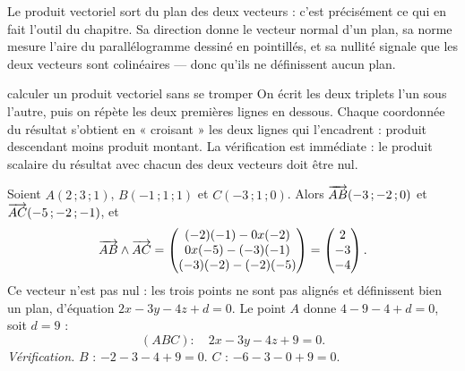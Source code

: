 \begin{visualisation}
\begin{center}
\end{center}

Le produit vectoriel sort du plan des deux vecteurs : c'est précisément ce qui
en fait l'outil du chapitre. Sa direction donne le vecteur normal d'un plan,
sa norme mesure l'aire du parallélogramme dessiné en pointillés, et sa
nullité signale que les deux vecteurs sont colinéaires — donc qu'ils ne
définissent aucun plan.
\end{visualisation}

\begin{methode}{calculer un produit vectoriel sans se tromper}
On écrit les deux triplets l'un sous l'autre, puis on répète les deux
premières lignes en dessous. Chaque coordonnée du résultat s'obtient en
« croisant » les deux lignes qui l'encadrent : produit descendant moins
produit montant. La vérification est immédiate : le produit scalaire du
résultat avec chacun des deux vecteurs doit être nul.
\end{methode}

\begin{exemple}
Soient $A(2\,;3\,;1)$, $B(-1\,;1\,;1)$ et $C(-3\,;1\,;0)$. Alors
$\overrightarrow{AB}(-3\,;-2\,;0)$ et $\overrightarrow{AC}(-5\,;-2\,;-1)$, et
\[
  \overrightarrow{AB} \wedge \overrightarrow{AC} =
  \begin{pmatrix}
    (-2)(-1)-0 x(-2) \\ 0 x(-5)-(-3)(-1) \\
    (-3)(-2)-(-2)(-5)
  \end{pmatrix}
  = \begin{pmatrix} 2 \\ -3 \\ -4 \end{pmatrix}.
\]
Ce vecteur n'est pas nul : les trois points ne sont pas alignés et
définissent bien un plan, d'équation $2x-3y-4z+d = 0$. Le point $A$ donne
$4-9-4+d = 0$, soit $d = 9$ :
\[
  (ABC) : \quad 2x-3y-4z+9 = 0 .
\]
\emph{Vérification.} $B$ : $-2-3-4+9 = 0$. $C$ : $-6-3-0+9 = 0$.
\end{exemple}

